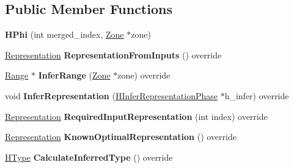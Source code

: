 \subsection*{Public Member Functions}
\begin{DoxyCompactItemize}
\item 
{\bfseries H\+Phi} (int merged\+\_\+index, \hyperlink{classv8_1_1internal_1_1_zone}{Zone} $\ast$zone)\hypertarget{classv8_1_1internal_1_1_h_phi_afaa7e8b841d6884a543feef9ec503b08}{}\label{classv8_1_1internal_1_1_h_phi_afaa7e8b841d6884a543feef9ec503b08}

\item 
\hyperlink{classv8_1_1internal_1_1_representation}{Representation} {\bfseries Representation\+From\+Inputs} () override\hypertarget{classv8_1_1internal_1_1_h_phi_acc898b08e52db212e943e3fecb0ae1ee}{}\label{classv8_1_1internal_1_1_h_phi_acc898b08e52db212e943e3fecb0ae1ee}

\item 
\hyperlink{classv8_1_1internal_1_1_range}{Range} $\ast$ {\bfseries Infer\+Range} (\hyperlink{classv8_1_1internal_1_1_zone}{Zone} $\ast$zone) override\hypertarget{classv8_1_1internal_1_1_h_phi_a795e22016bf84873b15248da2029eab8}{}\label{classv8_1_1internal_1_1_h_phi_a795e22016bf84873b15248da2029eab8}

\item 
void {\bfseries Infer\+Representation} (\hyperlink{classv8_1_1internal_1_1_h_infer_representation_phase}{H\+Infer\+Representation\+Phase} $\ast$h\+\_\+infer) override\hypertarget{classv8_1_1internal_1_1_h_phi_a3b5bed2fc378930a3321417892f36dc4}{}\label{classv8_1_1internal_1_1_h_phi_a3b5bed2fc378930a3321417892f36dc4}

\item 
\hyperlink{classv8_1_1internal_1_1_representation}{Representation} {\bfseries Required\+Input\+Representation} (int index) override\hypertarget{classv8_1_1internal_1_1_h_phi_af8a192d2d2896c685e28c0feab4a36fa}{}\label{classv8_1_1internal_1_1_h_phi_af8a192d2d2896c685e28c0feab4a36fa}

\item 
\hyperlink{classv8_1_1internal_1_1_representation}{Representation} {\bfseries Known\+Optimal\+Representation} () override\hypertarget{classv8_1_1internal_1_1_h_phi_a81d804a5948ed5ec193a1b22881b0fb6}{}\label{classv8_1_1internal_1_1_h_phi_a81d804a5948ed5ec193a1b22881b0fb6}

\item 
\hyperlink{classv8_1_1internal_1_1_h_type}{H\+Type} {\bfseries Calculate\+Inferred\+Type} () override\hypertarget{classv8_1_1internal_1_1_h_phi_ab9a1507de737a25c812d38bbb0a283f9}{}\label{classv8_1_1internal_1_1_h_phi_ab9a1507de737a25c812d38bbb0a283f9}


\end{DoxyCompactItemize}
